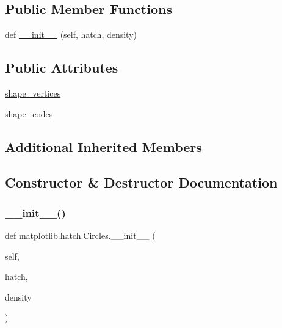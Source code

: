 \subsection*{Public Member Functions}
\begin{DoxyCompactItemize}
\item 
def \hyperlink{classmatplotlib_1_1hatch_1_1Circles_a57cc92eaf2047209ddf6f8c77bdfd886}{\+\_\+\+\_\+init\+\_\+\+\_\+} (self, hatch, density)
\end{DoxyCompactItemize}
\subsection*{Public Attributes}
\begin{DoxyCompactItemize}
\item 
\hyperlink{classmatplotlib_1_1hatch_1_1Circles_af17f1a7017fbc6658b55c2f669083c15}{shape\+\_\+vertices}
\item 
\hyperlink{classmatplotlib_1_1hatch_1_1Circles_a1d3790fa243da4ccfe066254fa55f89b}{shape\+\_\+codes}
\end{DoxyCompactItemize}
\subsection*{Additional Inherited Members}


\subsection{Constructor \& Destructor Documentation}
\mbox{\label{classmatplotlib_1_1hatch_1_1Circles_a57cc92eaf2047209ddf6f8c77bdfd886}} 
\subsubsection{\texorpdfstring{\+\_\+\+\_\+init\+\_\+\+\_\+()}{\_\_init\_\_()}}
{\footnotesize\ttfamily def matplotlib.\+hatch.\+Circles.\+\_\+\+\_\+init\+\_\+\+\_\+ (\begin{DoxyParamCaption}\item[{}]{self,  }\item[{}]{hatch,  }\item[{}]{density }\end{DoxyParamCaption})}



